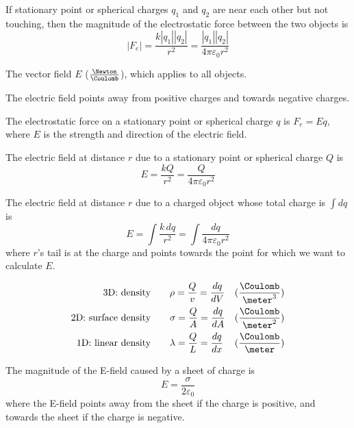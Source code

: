 \begin{namedlaw}
  If stationary point or spherical charges $q_1$ and $q_2$ are near each other but not touching, then the magnitude of the electrostatic force between the two objects is
  \[
    |F_e| = \frac{k |q_1| |q_2|}{r^2} = \frac{|q_1| |q_2|}{4 \pi \varepsilon_0 r^2}
  \]
\end{namedlaw}

\begin{definition}
  The vector field $E$ ($\frac{\Newton}{\Coulomb}$), which applies to all objects.

  The electric field points away from positive charges and towards negative charges.
\end{definition}

\begin{law}
  The electrostatic force on a stationary point or spherical charge $q$ is $F_e = Eq$, where $E$ is the strength and direction of the electric field.
\end{law}

\begin{law}
  The electric field at distance $r$ due to a stationary point or spherical charge $Q$ is
  \[
    E = \frac{kQ}{r^2} = \frac{Q}{4\pi\varepsilon_0 r^2}
  \]

  The electric field at distance $r$ due to a charged object whose total charge is $\int dq$ is
  \[
    E = \int \frac{k \,dq}{r^2} = \int \frac{dq}{4 \pi \varepsilon_0 r^2}
  \]
  where $r$'s tail is at the charge and points towards the point for which we want to calculate $E$.
\end{law}

\begin{definition}
  \begin{align*}
    \text{3D: density} \qquad & \rho = \frac{Q}{v} = \frac{dq}{dV} & (\frac{\Coulomb}{\meter^3}) \\
    \text{2D: surface density} \qquad & \sigma = \frac{Q}{A} = \frac{dq}{dA} & (\frac{\Coulomb}{\meter^2}) \\
    \text{1D: linear density} \qquad & \lambda = \frac{Q}{L} = \frac{dq}{dx} & (\frac{\Coulomb}{\meter}) \\
  \end{align*}
\end{definition}

\begin{example}
  The magnitude of the E-field caused by a sheet of charge is
  \[
    E = \frac{\sigma}{2\varepsilon_0}
  \]
  where the E-field points away from the sheet if the charge is positive, and towards the sheet if the charge is negative.
\end{example}

